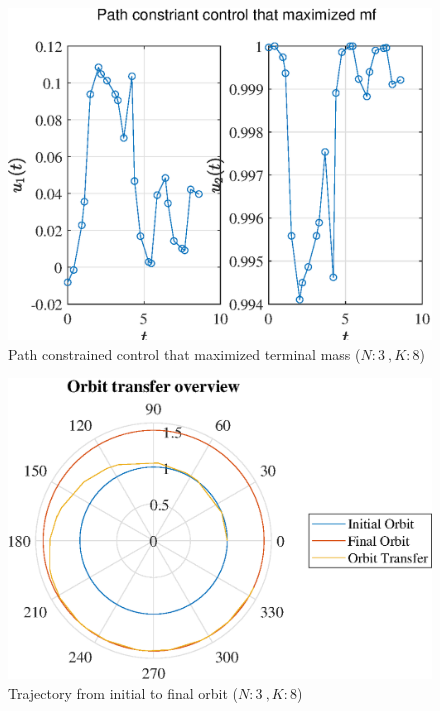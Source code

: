 \documentclass[]{article}
\begin{document}
	\begin{figure}
		\centering
		\includegraphics[scale=0.75]{path_N3_K8_C3_mf.eps}
		\caption{Path constrained control that maximized terminal mass (\(N:3\ , K:8\))}
		\label{fig:path_N3_K8_C3_mf}
	\end{figure}
	\begin{figure}
		\centering
		\includegraphics[scale=0.75]{orbit_N3_K8_C3_mf.eps}
		\caption{Trajectory from initial to final orbit (\(N:3\ , K:8\))}
		\label{fig:orbit_N3_K8_C3_mf}
	\end{figure}
\end{document}
